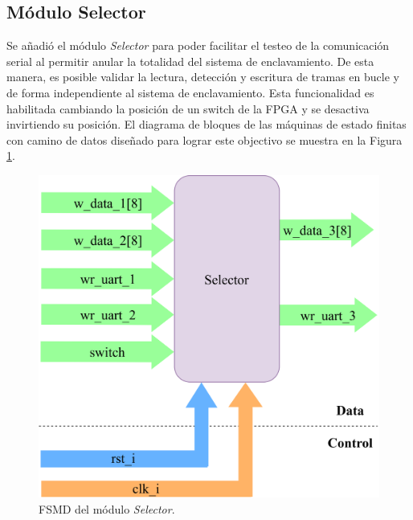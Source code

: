 \subsection{Módulo Selector}

Se añadió el módulo \textit{Selector} para poder facilitar el testeo de la comunicación serial al permitir anular la totalidad del sistema de enclavamiento. De esta manera, es posible validar la lectura, detección y escritura de tramas en bucle y de forma independiente al sistema de enclavamiento. Esta funcionalidad es habilitada cambiando la posición de un switch de la FPGA y se desactiva invirtiendo su posición. El diagrama de bloques de las máquinas de estado finitas con camino de datos diseñado para lograr este objectivo se muestra en la Figura \ref{fig:Selector_module}.

\begin{figure}[H]
	\centering
	\includegraphics[width=1\textwidth]{Figuras/Selector_module.png}
	\centering\caption{FSMD del módulo \textit{Selector}.}
	\label{fig:Selector_module}
\end{figure}